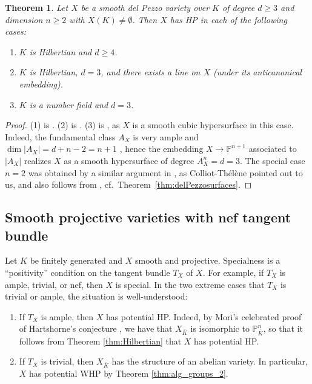 \documentclass[10pt,a4paper]{amsart}
\theoremstyle{plain}
\newtheorem{theorem}{Theorem}
\theoremstyle{remark}
\numberwithin{theorem}{section}
\begin{document}
\begin{theorem}
Let $X$ be a smooth del Pezzo variety over $K$ of degree $d\geq 3$ and dimension $n\geq2$ with $X(K)\neq\emptyset$. Then $X$ has HP in each of the following cases:
\begin{enumerate}
\item $K$ is Hilbertian and $d\geq 4$.
\item $K$ is Hilbertian, $d=3$, and there exists a line on $X$ (under its anticanonical embedding).
\item $K$ is a number field and $d=3$. 
\end{enumerate}
\end{theorem}
 
\begin{proof}
(1) is \cite[Theorem~1.5(a)]{Streeter}.
(2) is \cite[Theorem~1.5(b)]{Streeter}.
(3) is \cite[Theorem~3.1]{Demeio2},
as $X$ is a smooth cubic hypersurface in this case.
Indeed,
the fundamental class $A_X$ is very ample and $\dim |A_X|=d+n-2=n+1$   \cite[Proposition~2.2(i,iv)]{Kuznetsov},
hence
the embedding $X\to \mathbb{P}^{n+1}$ associated to $|A_X|$ realizes $X$ as a smooth hypersurface of degree $A_X^n=d=3$.  
The special case $n=2$ 
was obtained by a similar argument in \cite[Theorem 46.1]{Manin}, as Colliot-Th\'el\`ene pointed out to us,
and also follows from \cite{SwinnertonDyer}, cf.~Theorem~\ref{thm:delPezzosurfaces}.
\end{proof}
 
 
\subsection{Smooth projective varieties with nef tangent bundle} 
Let $K$ be finitely generated and
$X$ smooth and projective.
Specialness is a ``positivity'' condition on the tangent bundle $T_X$ of $X$. For example, if $T_X$ is ample, trivial, or nef, then $X$ is special. In the two extreme cases that $T_X$ is trivial or ample, the situation is well-understood:

\begin{enumerate}
    \item If $T_X$ is ample, then $X$ has potential HP. Indeed, by Mori's celebrated proof of Hartshorne's conjecture \cite{Mori}, we have that $X_{\overline{K}}$ is isomorphic to $\mathbb{P}^n_{\overline{K}}$, so that it follows from Theorem \ref{thm:Hilbertian} that $X$ has potential HP.
    \item If $T_X$ is trivial, then $X_{\overline{K}}$ has the structure of an abelian variety. In particular, $X$ has potential WHP by Theorem \ref{thm:alg_groups_2}.
\end{enumerate}
\end{document}
